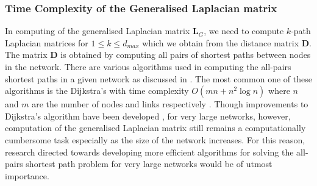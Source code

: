\documentclass[10pt,a4paper]{article}
\theoremstyle{plain}
\theoremstyle{definition}
\begin{document}
        \subsubsection{Time Complexity of the Generalised Laplacian matrix} 
        In computing of the generalised Laplacian matrix $\mathbf{L}_G$, we need to compute $k$-path Laplacian matrices for $1 \leq k \leq d_{max}$ which we obtain from the distance matrix $\mathbf{D}$. The matrix $\mathbf{D}$ is obtained by computing all pairs of shortest paths between nodes in the network. There are various algorithms used in computing the all-pairs shortest paths in a given network as discussed in \citep{cherkassky1996shortest}. The most common one of these algorithms is the Dijkstra's with time complexity $O(mn+n^2 \log n)$ where $n$ and $m$ are the number of nodes and links respectively \citep{dijkstra1959note,fredman1987fibonacci}. Though improvements to Dijkstra's algorithm have been developed \citep{pettie2002faster,thorup1999undirected,seidel1995all}, for very large networks, however, computation of the generalised Laplacian matrix still remains a computationally cumbersome task especially as the size of the network increases. For this reason, research directed towards developing more efficient algorithms for solving the all-pairs shortest path problem for very large networks would be of utmost importance. 
        
        
        
\end{document}
